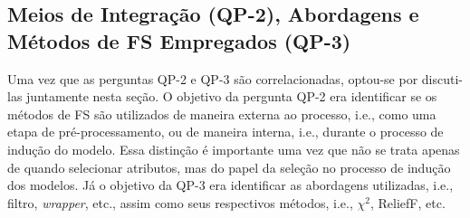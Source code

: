 \subsection{Meios de Integração (QP-2), Abordagens e Métodos de FS Empregados (QP-3)}\label{sec:qp2-3}

Uma vez que as perguntas QP-2 e QP-3 são correlacionadas, optou-se por discuti-las juntamente nesta seção. O objetivo da pergunta QP-2 era identificar se os métodos de FS são utilizados de maneira externa ao processo, i.e., como uma etapa de pré-processamento, ou de maneira interna, i.e., durante o processo de indução do modelo. Essa distinção é importante uma vez que não se trata apenas de quando selecionar atributos, mas do papel da seleção no processo de indução dos modelos. Já o objetivo da QP-3 era identificar as abordagens utilizadas, i.e., filtro, \textit{wrapper}, etc., assim como seus respectivos métodos, i.e., $\chi^2$, ReliefF, etc.

